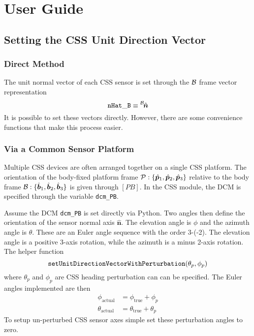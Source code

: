 
\section{User Guide}

\subsection{Setting the CSS Unit Direction Vector}
\subsubsection{Direct Method}
The unit normal vector of each CSS sensor is set through the $\cal B$ frame vector representation
\begin{equation}
		{\tt nHat\_B} \equiv \leftexp{B}{\hat{\bm n}}
\end{equation}
It is possible to set these vectors directly.  However, there are some convenience functions that make this process easier.  

\subsubsection{Via a Common Sensor Platform}
Multiple CSS devices are often arranged together on a single CSS platform.  The orientation of the body-fixed platform frame $\frameDefinition{P}$ relative to the body frame $\frameDefinition{B}$ is given through $[PB]$.  In the CSS module, the DCM is specified through the variable {\tt dcm\_PB}.

Assume the DCM  {\tt dcm\_PB} is set directly via Python.  Two angles then define the orientation of the sensor normal axis $\hat{\bm n}$.  The elevation angle is $\phi$ and the azimuth angle is $\theta$.  These are an Euler angle sequence with the order 3-(-2).  The elevation angle is a positive 3-axis rotation, while the azimuth is a minus 2-axis rotation.  The helper function
$$
{\tt setUnitDirectionVectorWithPerturbation}(\theta_{p}, \phi_{p}) 
$$
where $\theta_{p}$ and $\phi_{p}$ are CSS heading perturbation can can be specified.  The Euler angles implemented are then
\begin{align}
		\phi_{\text{actual}} &= \phi_{\text{true}} + \phi_{p} \\
		\theta_{\text{actual}} &= \theta_{\text{true}} + \theta_{p} 
\end{align}
To setup un-perturbed CSS sensor axes simple set these perturbation angles to zero.  

